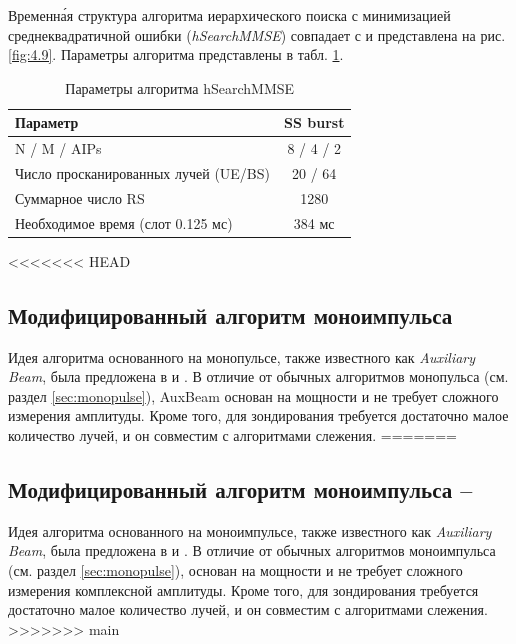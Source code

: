 Временн\'{а}я структура алгоритма иерархического поиска с минимизацией
среднеквадратичной ошибки (\textit{hSearchMMSE}) совпадает с \baseline{} и представлена на рис. \ref{fig:4.9}.
Параметры алгоритма представлены в табл. \ref{tab:4.3}.
\begin{table}
    \centering
    \caption{Параметры алгоритма hSearchMMSE}
    \label{tab:4.3}
    \begin{tabular}{|l|c|}
        \hline
        Параметр                             & SS burst  \\
        \hline
        N / M / AIPs                         & 8 / 4 / 2 \\
        Число просканированных лучей (UE/BS) & 20 / 64   \\
        Суммарное число RS                   & 1280      \\
        Необходимое время (слот 0.125 мс)    & 384 мс    \\
        \hline
    \end{tabular}
\end{table}

<<<<<<< HEAD
\subsection{Модифицированный алгоритм моноимпульса}
Идея алгоритма основанного на монопульсе, также известного как \textit{Auxiliary Beam}, была
предложена в \cite{Zhu2016} и \cite{Kim2019}. В отличие от обычных алгоритмов
монопульса (см. раздел \ref{sec:monopulse}), AuxBeam основан на мощности и не
требует сложного измерения амплитуды. Кроме того, для зондирования требуется
достаточно малое количество лучей, и он совместим с алгоритмами слежения. 
=======
\subsection[Модифицированный алгоритм моноимпульса]{Модифицированный алгоритм моноимпульса -- \AuxBeam{}}
\label{sec:AuxBeam:singlepath}
Идея алгоритма основанного на моноимпульсе, также известного как \textit{Auxiliary Beam}, была
предложена в \cite{Zhu2016} и \cite{Kim2019}. В отличие от обычных алгоритмов
моноимпульса (см. раздел \ref{sec:monopulse}), \AuxBeam{} основан на мощности и не
требует сложного измерения комплексной амплитуды. Кроме того, для зондирования требуется
достаточно малое количество лучей, и он совместим с алгоритмами слежения.
>>>>>>> main

